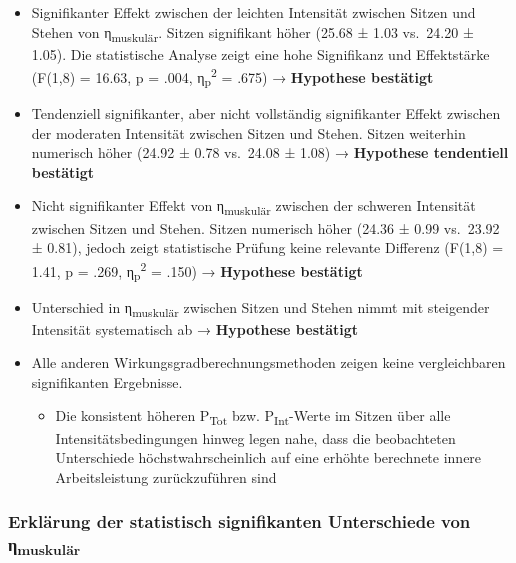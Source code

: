 \documentclass[
  letterpaper,
  DIV=11]{scrartcl}
\providecommand{\tightlist}{%
  \setlength{\itemsep}{0pt}\setlength{\parskip}{0pt}}\usepackage{longtable,booktabs,array}
\begin{document}
\begin{itemize}
\item
  Signifikanter Effekt zwischen der leichten Intensität zwischen Sitzen
  und Stehen von η\textsubscript{muskulär}. Sitzen signifikant höher
  (25.68 ± 1.03 vs.~24.20 ± 1.05). Die statistische Analyse zeigt eine
  hohe Signifikanz und Effektstärke (F(1,8) = 16.63, p = .004,
  η\textsubscript{p}\textsuperscript{2} = .675) → \textbf{Hypothese
  bestätigt}
\item
  Tendenziell signifikanter, aber nicht vollständig signifikanter Effekt
  zwischen der moderaten Intensität zwischen Sitzen und Stehen. Sitzen
  weiterhin numerisch höher (24.92 ± 0.78 vs.~24.08 ± 1.08) →
  \textbf{Hypothese tendentiell bestätigt}
\item
  Nicht signifikanter Effekt von η\textsubscript{muskulär} zwischen der
  schweren Intensität zwischen Sitzen und Stehen. Sitzen numerisch höher
  (24.36 ± 0.99 vs.~23.92 ± 0.81), jedoch zeigt statistische Prüfung
  keine relevante Differenz (F(1,8) = 1.41, p = .269,
  η\textsubscript{p}\textsuperscript{2} = .150) → \textbf{Hypothese
  bestätigt}
\item
  Unterschied in η\textsubscript{muskulär} zwischen Sitzen und Stehen
  nimmt mit steigender Intensität systematisch ab → \textbf{Hypothese
  bestätigt}
\item
  Alle anderen Wirkungsgradberechnungsmethoden zeigen keine
  vergleichbaren signifikanten Ergebnisse.

  \begin{itemize}
  \tightlist
  \item
    Die konsistent höheren P\textsubscript{Tot} bzw.
    P\textsubscript{Int}-Werte im Sitzen über alle
    Intensitätsbedingungen hinweg legen nahe, dass die beobachteten
    Unterschiede höchstwahrscheinlich auf eine erhöhte berechnete innere
    Arbeitsleistung zurückzuführen sind
  \end{itemize}
\end{itemize}

\subsubsection{\texorpdfstring{Erklärung der statistisch signifikanten
Unterschiede von
η\textsubscript{muskulär}}{Erklärung der statistisch signifikanten Unterschiede von ηmuskulär}}\label{erkluxe4rung-der-statistisch-signifikanten-unterschiede-von-ux3b7muskuluxe4r}
\end{document}
